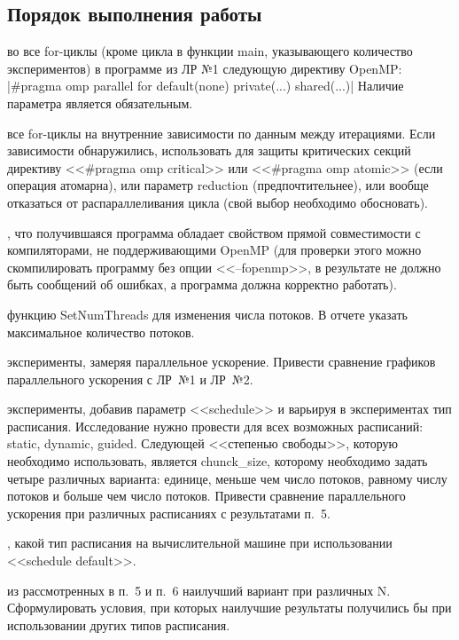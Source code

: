 \subsection{Порядок выполнения работы}
\begin{enumerate}
     во все for-циклы (кроме цикла в функции main, указывающего количество экспериментов) в программе из ЛР №1 следующую директиву OpenMP:
    |#pragma omp parallel for default(none) private(...) shared(...)|
    Наличие параметра  является обязательным.
    
     все for-циклы на внутренние зависимости по данным между итерациями. Если зависимости обнаружились, использовать для защиты критических секций директиву <<\#pragma omp critical>> или <<\#pragma omp atomic>> (если операция атомарна), или параметр reduction (предпочтительнее), или вообще отказаться от распараллеливания цикла (свой выбор необходимо обосновать).
    
    , что получившаяся программа обладает свойством прямой совместимости с компиляторами, не поддерживающими OpenMP (для проверки этого можно скомпилировать программу без опции <<–fopenmp>>, в результате не должно быть сообщений об ошибках, а программа должна корректно работать).
    
     функцию SetNumThreads для изменения числа потоков. В отчете указать максимальное количество потоков.
    
     эксперименты, замеряя параллельное ускорение. Привести сравнение графиков параллельного ускорения с ЛР~№1 и ЛР~№2.
    
     эксперименты, добавив параметр <<schedule>> и варьируя в экспериментах тип расписания. Исследование нужно провести для всех возможных расписаний: static, dynamic, guided. Следующей <<степенью свободы>>, которую необходимо использовать, является chunck\_size, которому необходимо задать четыре различных варианта: единице, меньше чем число потоков, равному числу потоков и больше чем число потоков. Привести сравнение параллельного ускорения при различных расписаниях с результатами п.~5.
    
    , какой тип расписания на вычислительной машине при использовании <<schedule default>>.
    
     из рассмотренных в п.~5 и п.~6 наилучший вариант при различных N. Сформулировать условия, при которых наилучшие результаты получились бы при использовании других типов расписания.
    

\end{enumerate}
